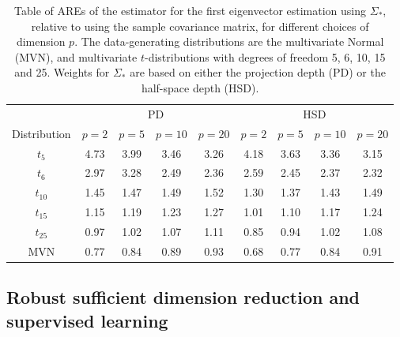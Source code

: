 \begin{table}[t]
\centering
\begin{footnotesize}
\begin{tabular}{c|cccc|cccc}
    \hline
    & \multicolumn{4}{c|}{PD} & \multicolumn{4}{c}{HSD} \\\cline{2-9}
    Distribution & $p=2$  & $p=5$  & $p=10$ & $p=20$ & $p=2$  & $p=5$  & $p=10$ & $p=20$ \\ \hline
    $t_5$           & 4.73 & 3.99 & 3.46 & 3.26 & 4.18 & 3.63 & 3.36 & 3.15 \\
    $t_6$           & 2.97 & 3.28 & 2.49 & 2.36 & 2.59 & 2.45 & 2.37 & 2.32 \\
    $t_{10}$          & 1.45 & 1.47 & 1.49 & 1.52 & 1.30 & 1.37 & 1.43 & 1.49 \\
    $t_{15}$          & 1.15 & 1.19 & 1.23 & 1.27 & 1.01 & 1.10 & 1.17 & 1.24 \\
    $t_{25}$          & 0.97 & 1.02 & 1.07 & 1.11 & 0.85 & 0.94 & 1.02 & 1.08 \\
    MVN          & 0.77 & 0.84 & 0.89 & 0.93 & 0.68 & 0.77 & 0.84 & 0.91 \\ 
    \hline
\end{tabular}
\end{footnotesize}
\caption{Table of AREs of the estimator for the first eigenvector estimation using 
$\Sigma_{*}$, relative to using the sample covariance matrix, for different choices of 
dimension $p$. The data-generating distributions are the multivariate Normal (MVN), 
and multivariate $t$-distributions with degrees of freedom 5, 6, 10, 15 and 25. Weights 
for $\Sigma_{*}$ are based on either the projection depth (PD) or the half-space 
depth (HSD).}
\label{table:AREtable}
\end{table}

\subsection{Robust sufficient dimension reduction and supervised learning}

